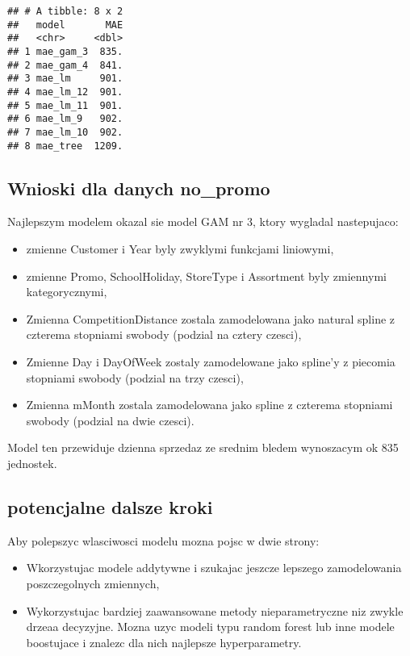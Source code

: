 \documentclass[]{article}
\providecommand{\tightlist}{%
  \setlength{\itemsep}{0pt}\setlength{\parskip}{0pt}}
\begin{document}
\begin{verbatim}
## # A tibble: 8 x 2
##   model       MAE
##   <chr>     <dbl>
## 1 mae_gam_3  835.
## 2 mae_gam_4  841.
## 3 mae_lm     901.
## 4 mae_lm_12  901.
## 5 mae_lm_11  901.
## 6 mae_lm_9   902.
## 7 mae_lm_10  902.
## 8 mae_tree  1209.
\end{verbatim}

\hypertarget{wnioski-dla-danych-no_promo}{%
\subsection{Wnioski dla danych
no\_promo}\label{wnioski-dla-danych-no_promo}}

Najlepszym modelem okazal sie model GAM nr 3, ktory wygladal
nastepujaco:

\begin{itemize}
\tightlist
\item
  zmienne Customer i Year byly zwyklymi funkcjami liniowymi,
\item
  zmienne Promo, SchoolHoliday, StoreType i Assortment byly zmiennymi
  kategorycznymi,
\item
  Zmienna CompetitionDistance zostala zamodelowana jako natural spline z
  czterema stopniami swobody (podzial na cztery czesci),
\item
  Zmienne Day i DayOfWeek zostaly zamodelowane jako spline'y z piecomia
  stopniami swobody (podzial na trzy czesci),
\item
  Zmienna mMonth zostala zamodelowana jako spline z czterema stopniami
  swobody (podzial na dwie czesci).
\end{itemize}

Model ten przewiduje dzienna sprzedaz ze srednim bledem wynoszacym ok
835 jednostek.

\hypertarget{potencjalne-dalsze-kroki}{%
\subsection{potencjalne dalsze kroki}\label{potencjalne-dalsze-kroki}}

Aby polepszyc wlasciwosci modelu mozna pojsc w dwie strony:

\begin{itemize}
\item
  Wkorzystujac modele addytywne i szukajac jeszcze lepszego
  zamodelowania poszczegolnych zmiennych,
\item
  Wykorzystujac bardziej zaawansowane metody nieparametryczne niz zwykle
  drzeaa decyzyjne. Mozna uzyc modeli typu random forest lub inne modele
  boostujace i znalezc dla nich najlepsze hyperparametry.
\end{itemize}
\end{document}

